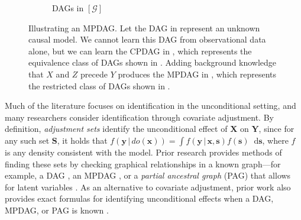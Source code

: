 \documentclass[11pt]{article}
\newcommand{\mb}[1]{\mathbf{#1}}
\newcommand{\g}[1][G]{\mathcal{#1}}
\newcommand*\diff{\mathop{}\!\mathrm{d}}
\begin{document}
\begin{figure}
\begin{subfigure}{.17\textwidth}
    \caption{MPDAG $\g$}
    \label{fig:graphs-mpdag}
    \begin{center}
    \hspace{.2cm}
    \end{center}
    \caption{DAGs in $[\g]$}
    \label{fig:graphs-dagsinmpdag}
    \end{subfigure}
    \caption{Illustrating an MPDAG. Let the DAG in  represent an unknown causal model. We cannot learn this DAG from observational data alone, but we can learn the CPDAG in , which represents the equivalence class of DAGs shown in . Adding background knowledge that $X$ and $Z$ precede $Y$ produces the MPDAG in , which represents the restricted class of DAGs shown in .}
    \label{fig:graphs}
\end{figure}


Much of the literature focuses on identification in the unconditional setting, and many researchers consider identification through covariate adjustment. By definition, \textit{adjustment sets} identify the unconditional effect of $\mb{X}$ on $\mb{Y}$, since for any such set $\mb{S}$, it holds that $f(\mb{y} \,|\, do(\mb{x})) = \int f(\mb{y} \,|\, \mb{x}, \mb{s}) f(\mb{s}) \diff \mb{s}$, where $f$ is any density consistent with the model. Prior research provides methods of finding these sets by checking graphical relationships in a known graph---for example, a DAG \citep{pearl1995causal, shpitser2012validity}, an MPDAG \citep{perkovic2017interpreting}, or a \textit{partial ancestral graph} (PAG) that allows for latent variables \citep{van2014constructing, maathuis2015generalized, perkovic2018complete}. As an alternative to covariate adjustment, prior work also provides exact formulas for identifying unconditional effects when a DAG, MPDAG, or PAG is known \citep{perkovic2020identifying, jaber2018graphical}.
\end{document}
